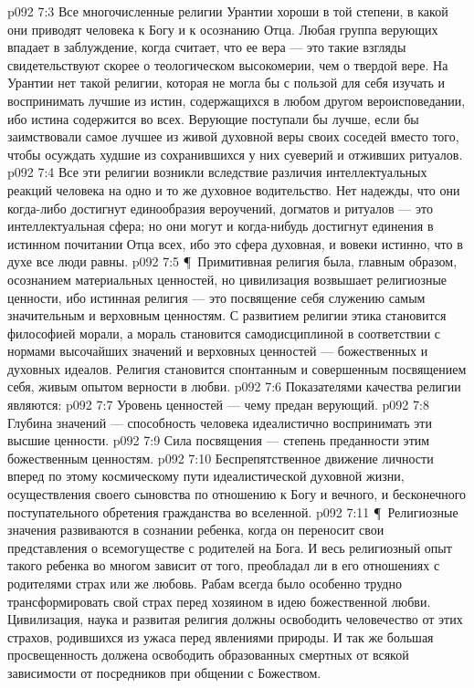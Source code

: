 \vs p092 7:3 Все многочисленные религии Урантии хороши в той степени, в какой они приводят человека к Богу и к осознанию Отца. Любая группа верующих впадает в заблуждение, когда считает, что ее вера --- это  такие взгляды свидетельствуют скорее о теологическом высокомерии, чем о твердой вере. На Урантии нет такой религии, которая не могла бы с пользой для себя изучать и воспринимать лучшие из истин, содержащихся в любом другом вероисповедании, ибо истина содержится во всех. Верующие поступали бы лучше, если бы заимствовали самое лучшее из живой духовной веры своих соседей вместо того, чтобы осуждать худшие из сохранившихся у них суеверий и отживших ритуалов.
\vs p092 7:4 Все эти религии возникли вследствие различия интеллектуальных реакций человека на одно и то же духовное водительство. Нет надежды, что они когда\hyp{}либо достигнут единообразия вероучений, догматов и ритуалов --- это интеллектуальная сфера; но они могут и когда\hyp{}нибудь достигнут единения в истинном почитании Отца всех, ибо это сфера духовная, и вовеки истинно, что в духе все люди равны.
\vs p092 7:5 \P\ Примитивная религия была, главным образом, осознанием материальных ценностей, но цивилизация возвышает религиозные ценности, ибо истинная религия --- это посвящение себя служению самым значительным и верховным ценностям. С развитием религии этика становится философией морали, а мораль становится самодисциплиной в соответствии с нормами высочайших значений и верховных ценностей --- божественных и духовных идеалов. Религия становится спонтанным и совершенным посвящением себя, живым опытом верности в любви.
\vs p092 7:6 Показателями качества религии являются:
\vs p092 7:7 \bibnobreakspace Уровень ценностей --- чему предан верующий.
\vs p092 7:8 \bibnobreakspace Глубина значений --- способность человека идеалистично воспринимать эти высшие ценности.
\vs p092 7:9 \bibnobreakspace Сила посвящения --- степень преданности этим божественным ценностям.
\vs p092 7:10 \bibnobreakspace Беспрепятственное движение личности вперед по этому космическому пути идеалистической духовной жизни, осуществления своего сыновства по отношению к Богу и вечного, и бесконечного поступательного обретения гражданства во вселенной.
\vs p092 7:11 \P\ Религиозные значения развиваются в сознании ребенка, когда он переносит свои представления о всемогуществе с родителей на Бога. И весь религиозный опыт такого ребенка во многом зависит от того, преобладал ли в его отношениях с родителями страх или же любовь. Рабам всегда было особенно трудно трансформировать свой страх перед хозяином в идею божественной любви. Цивилизация, наука и развитая религия должны освободить человечество от этих страхов, родившихся из ужаса перед явлениями природы. И так же большая просвещенность должена освободить образованных смертных от всякой зависимости от посредников при общении с Божеством.
